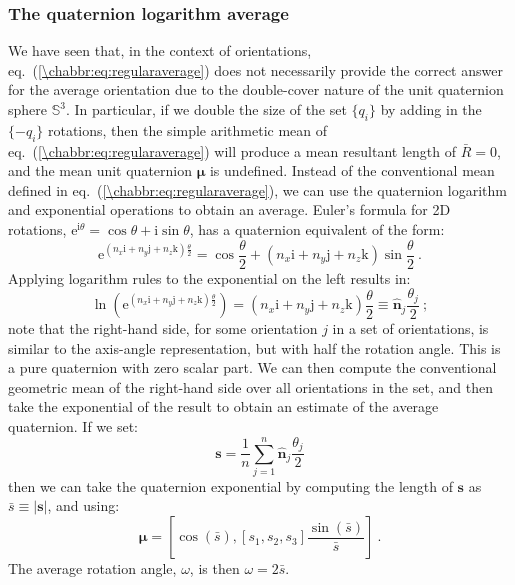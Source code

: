 \subsubsection{The quaternion logarithm average}\label{\chabbr:ssec:quatlogav}
We have seen that, in the context of orientations, eq.~(\ref{\chabbr:eq:regularaverage}) does not necessarily provide the correct answer for the average orientation due to the double-cover nature of the unit quaternion sphere $\mathbb{S}^3$. In particular, if we double the size of the set $\{q_i\}$ by adding in the $\{-q_i\}$ rotations, then the simple arithmetic mean of eq.~(\ref{\chabbr:eq:regularaverage}) will produce a mean resultant length of $\bar{R}=0$, and the mean unit quaternion $\bm{\mu}$ is undefined.  Instead of the conventional mean defined in eq.~(\ref{\chabbr:eq:regularaverage}), we can use the quaternion logarithm and exponential operations to obtain an average. Euler's formula for 2D rotations, $\mathrm{e}^{\mathrm{i}\theta}=\cos\theta+\mathrm{i}\sin\theta$, has a quaternion equivalent of the form:
\begin{equation}
	\mathrm{e}^{(n_x\mathrm{i}+n_y\mathrm{j}+n_z\mathrm{k})\frac{\theta}{2}} = \cos\frac{\theta}{2}+(n_x\mathrm{i}+n_y\mathrm{j}+n_z\mathrm{k})\sin\frac{\theta}{2}\ .
\end{equation}
Applying logarithm rules to the exponential on the left results in:
\begin{equation}
	\ln\left(\mathrm{e}^{(n_x\mathrm{i}+n_y\mathrm{j}+n_z\mathrm{k})\frac{\theta}{2}}\right) = (n_x\mathrm{i}+n_y\mathrm{j}+n_z\mathrm{k})\frac{\theta}{2}\equiv
	\hat{\mathbf{n}}_j\frac{\theta_j}{2}\ ;
\end{equation}
note that the right-hand side, for some orientation $j$ in a set of orientations, is similar to the axis-angle representation, but with half the rotation angle. This is a pure quaternion with zero scalar part.  We can then compute the conventional geometric mean of the right-hand side over all orientations in the set, and then take the exponential of the result to obtain an estimate of the average quaternion. If we set:
\[
	\mathbf{s} = \frac{1}{n}\sum_{j=1}^{n} \hat{\mathbf{n}}_j\frac{\theta_j}{2}
\]
then we can take the quaternion exponential by computing the length of $\mathbf{s}$ as $\bar{s}\equiv\vert\mathbf{s}\vert$, and using:
\[
	\bm{\mu} = \left[ \cos(\bar{s}), [s_1,s_2,s_3]\frac{\sin(\bar{s})}{\bar{s}} \right]\ .
\]
The average rotation angle, $\omega$, is then $\omega=2\bar{s}$. 

